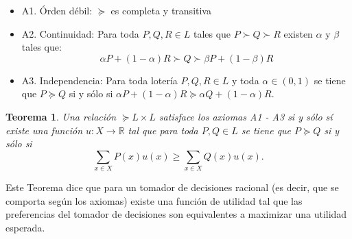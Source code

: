 \documentclass[11pt]{article}
\theoremstyle{plain}
\newtheorem{teo}{Teorema}
\begin{document}
\begin{itemize}
\item A1. Órden débil: $\succeq$ es completa y transitiva
\item A2. Continuidad: Para toda $P,Q,R \in L$ tales que $P \succ Q \succ R$ existen $\alpha$ y $\beta$ tales que:
\[  \alpha P + (1-\alpha) R \succ Q \succ \beta P + (1-\beta) R\]
\item A3. Independencia: Para toda lotería $P,Q,R \in L$ y toda $\alpha \in (0,1)$ se tiene que $P \succeq Q$ si y sólo si $\alpha P + (1-\alpha) R \succeq \alpha Q  + (1-\alpha) R$.
\end{itemize}
\begin{teo}
Una relación $\succeq L \times L$ satisface los axiomas A1 - A3 si y sólo sí existe una función $u: X \to \mathbb{R}$ tal que para toda $P,Q \in L$ se tiene que $P \succeq Q$ si y sólo si 
\[ \sum_{x \in X} P(x) u(x) \geq \sum_{x \in X} Q(x) u(x).  \]
\end{teo}
Este Teorema dice que para un tomador de decisiones racional (es decir, que se comporta según los axiomas) existe una función de utilidad tal que las preferencias del tomador de decisiones son equivalentes a maximizar una utilidad esperada.
\end{document}
